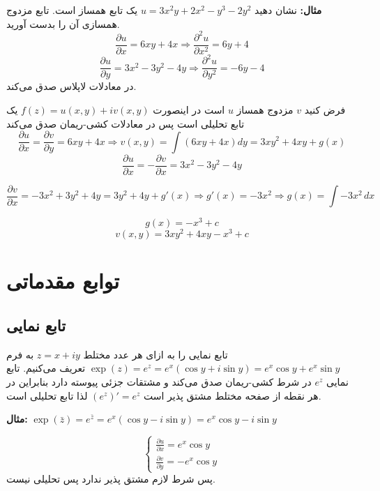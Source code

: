 \documentclass[12pt]{report}
\begin{document}
 	 	 	  \textbf{مثال:}
 	 	 	  نشان دهید
 	 	 	  $u = 3x^2y + 2x^2-y^3 - 2y^2$
 	 	 	  یک تابع همساز است. تابع مزدوج همسازی آن را بدست آورید.
 	 	 	  $$\frac{\partial u}{\partial x} = 6xy + 4x \Rightarrow \frac{\partial^2 u}{\partial x^2} = 6y+4$$
 	 	 	  $$\frac{\partial u}{\partial y} = 3x^2-3y^2 - 4y \Rightarrow \frac{\partial^2u}{\partial y^2} = -6y-4$$
 	 	 	  در معادلات لاپلاس صدق می‌کند.
 	 	 	  
 	 	 	  فرض کنید
 	 	 	  $v$
 	 	 	  مزدوج همساز 
 	 	 	  $u$
 	 	 	  است در اینصورت
 	 	 	  $f(z) = u(x, y) + iv(x, y)$
 	 	 	  یک تابع تحلیلی است پس در معادلات کشی-ریمان صدق می‌کند
 	 	 	  $$\frac{\partial u}{\partial x} = \frac{\partial v}{\partial y} = 6xy+4x\Rightarrow v(x, y) = \int (6xy + 4x) dy = 3xy^2 + 4xy + g(x)$$
 	 	 	  $$\frac{\partial u}{\partial x} = - \frac{\partial v}{\partial x} = 3x^2 - 3y^2 - 4y$$
 	 	 	  
 	 	 	  $$\frac{\partial v}{\partial x} = -3x^2 + 3y^2 + 4y = 3y^2 + 4y + g'(x) \Rightarrow g'(x) = -3x^2 \Rightarrow g(x) = \int -3x^2 \, dx$$
 	 	 	  
 	 	 	  $$g(x) = -x^3 + c$$
 	 	 	  $$v(x, y) = 3xy^2 + 4xy - x^3 + c$$
 	 	 	  \section{توابع مقدماتی}
 	 	 	  \subsection{تابع نمایی}
 	 	 	  تابع نمایی را به ازای هر عدد مختلط
 	 	 	  $z = x+iy$
 	 	 	  به فرم
 	 	 	  $\exp(z) = e^z = e^x(\cos y + i\sin y) = e^x \cos y + e^x \sin y$
 	 	 	  تعریف می‌کنیم. تابع نمایی 
 	 	 	  $e^z$
 	 	 	  در شرط کشی-ریمان صدق می‌کند و مشتقات جزئی پیوسته دارد بنابراین در هر نقطه از صفحه مختلط مشتق پذیر است
 	 	 	  $(e^z)' = e^z$
 	 	 	  لذا تابع تحلیلی است.
 	 	 	  
 	 	 	  \textbf{مثال:}
 	 	 	  $\exp(\bar z) = e^{\bar z} = e^x(\cos y - i\sin y) = e^x \cos y - i \sin y$
 	 	 	  
 	 	 	  \[
 	 	 	  \begin{cases}
 	 	 	  	\frac{\partial u}{\partial x} = e^x \cos y\\
 	 	 	  	\frac{\partial v}{\partial y} = -e^x \cos y
 	 	 	  \end{cases}
 	 	 	  \]
 	 	 	  پس شرط لازم مشتق پذیر ندارد پس تحلیلی نیست.
\end{document}
